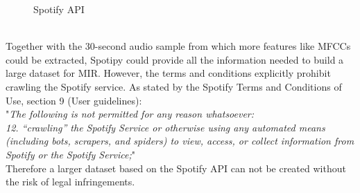 \begin{figure}[htbp]
	\centering
	\caption{Spotify API}
	\label{fig:spotify}
\end{figure}
\FloatBarrier
\ \\
Together with the 30-second audio sample from which more features like MFCCs could be extracted, Spotipy could provide all the information needed to build a large dataset for MIR. However, the terms and conditions explicitly prohibit crawling the Spotify service. As stated by the Spotify Terms and Conditions of Use, section 9 (User guidelines):\\
"\textit{The following is not permitted for any reason whatsoever:\newline
[...]\\
12. “crawling” the Spotify Service or otherwise using any automated means (including bots, scrapers, and spiders) to view, access, or collect information from Spotify or the Spotify Service;}" \cite{spottac1}\\
Therefore a larger dataset based on the Spotify API can not be created without the risk of legal infringements. %
